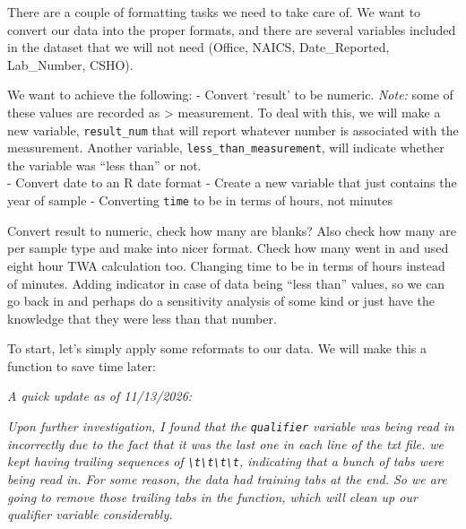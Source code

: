 \documentclass[
]{article}
\begin{document}
There are a couple of formatting tasks we need to take care of. We want
to convert our data into the proper formats, and there are several
variables included in the dataset that we will not need (Office, NAICS,
Date\_Reported, Lab\_Number, CSHO).

We want to achieve the following: - Convert `result' to be numeric.
\emph{Note:} some of these values are recorded as \textgreater{}
measurement. To deal with this, we will make a new variable,
\texttt{result\_num} that will report whatever number is associated with
the measurement. Another variable, \texttt{less\_than\_measurement},
will indicate whether the variable was ``less than'' or not.\\
- Convert date to an R date format - Create a new variable that just
contains the year of sample - Converting \texttt{time} to be in terms of
hours, not minutes

Convert result to numeric, check how many are blanks? Also check how
many are per sample type and make into nicer format. Check how many went
in and used eight hour TWA calculation too. Changing time to be in terms
of hours instead of minutes. Adding indicator in case of data being
``less than'' values, so we can go back in and perhaps do a sensitivity
analysis of some kind or just have the knowledge that they were less
than that number.

To start, let's simply apply some reformats to our data. We will make
this a function to save time later:

\emph{A quick update as of 11/13/2026:}

\emph{Upon further investigation, I found that the \texttt{qualifier}
variable was being read in incorrectly due to the fact that it was the
last one in each line of the txt file. we kept having trailing sequences
of
\texttt{\textbackslash{}t\textbackslash{}t\textbackslash{}t\textbackslash{}t},
indicating that a bunch of tabs were being read in. For some reason, the
data had training tabs at the end. So we are going to remove those
trailing tabs in the function, which will clean up our qualifier
variable considerably.}
\end{document}
